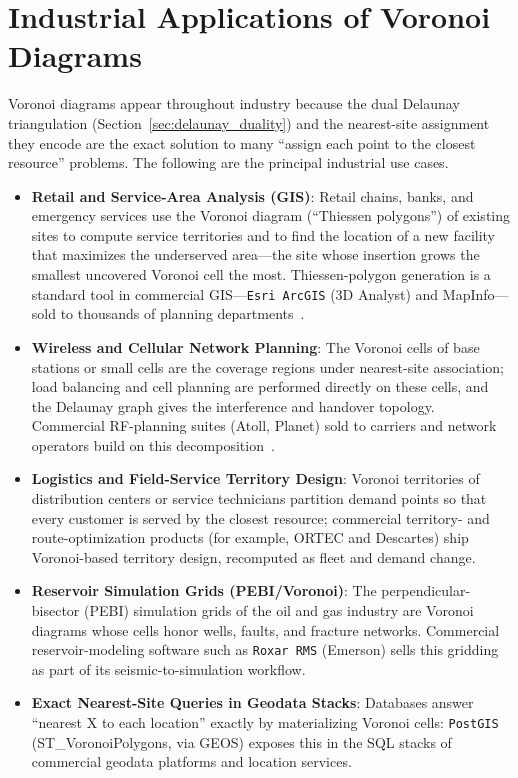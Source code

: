 \section{Industrial Applications of Voronoi Diagrams}
\label{sec:voronoi_applications}

Voronoi diagrams appear throughout industry because the dual Delaunay
triangulation (Section~\ref{sec:delaunay_duality}) and the nearest-site
assignment they encode are the exact solution to many ``assign each point to
the closest resource'' problems. The following are the principal industrial
use cases.

\begin{itemize}
\item \textbf{Retail and Service-Area Analysis (GIS)}: Retail chains, banks,
  and emergency services use the Voronoi diagram (``Thiessen polygons'') of
  existing sites to compute service territories and to find the location of a
  new facility that maximizes the underserved area---the site whose insertion
  grows the smallest uncovered Voronoi cell the most. Thiessen-polygon
  generation is a standard tool in commercial GIS---\texttt{Esri ArcGIS}
  (3D Analyst) and MapInfo---sold to thousands of planning
  departments~\cite{okabe2000}.

\item \textbf{Wireless and Cellular Network Planning}: The Voronoi cells of
  base stations or small cells are the coverage regions under nearest-site
  association; load balancing and cell planning are performed directly on
  these cells, and the Delaunay graph gives the interference and handover
  topology. Commercial RF-planning suites (Atoll, Planet) sold to carriers
  and network operators build on this decomposition~\cite{okabe2000}.

\item \textbf{Logistics and Field-Service Territory Design}: Voronoi
  territories of distribution centers or service technicians partition
  demand points so that every customer is served by the closest resource;
  commercial territory- and route-optimization products (for example, ORTEC
  and Descartes) ship Voronoi-based territory design, recomputed as fleet
  and demand change.

\item \textbf{Reservoir Simulation Grids (PEBI/Voronoi)}: The
  perpendicular-bisector (PEBI) simulation grids of the oil and gas industry
  are Voronoi diagrams whose cells honor wells, faults, and fracture
  networks. Commercial reservoir-modeling software such as \texttt{Roxar
  RMS} (Emerson) sells this gridding as part of its seismic-to-simulation
  workflow.

\item \textbf{Exact Nearest-Site Queries in Geodata Stacks}: Databases answer
  ``nearest X to each location'' exactly by materializing Voronoi cells:
  \texttt{PostGIS} (ST\_VoronoiPolygons, via GEOS) exposes this in the SQL
  stacks of commercial geodata platforms and location services.
\end{itemize}

